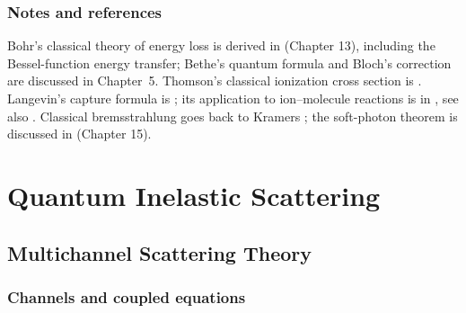 \documentclass[11pt,a4paper]{book}
\numberwithin{equation}{chapter}
\begin{document}
\section*{Notes and references}
Bohr's classical theory of energy loss \cite{Bohr13,Bohr48} is derived in \cite{Jackson} (Chapter 13), including the Bessel-function energy transfer; Bethe's quantum formula \cite{Bethe30} and Bloch's correction \cite{Bloch33} are discussed in Chapter~5. Thomson's classical ionization cross section is \cite{Thomson12}. Langevin's capture formula is \cite{Langevin05}; its application to ion--molecule reactions is in \cite{Gioumousis58}, see also \cite{LevineBernstein}. Classical bremsstrahlung goes back to Kramers \cite{Kramers23}; the soft-photon theorem is discussed in \cite{Jackson} (Chapter 15).

\part{Quantum Inelastic Scattering}

\chapter{Multichannel Scattering Theory}

\section{Channels and coupled equations}
\end{document}
